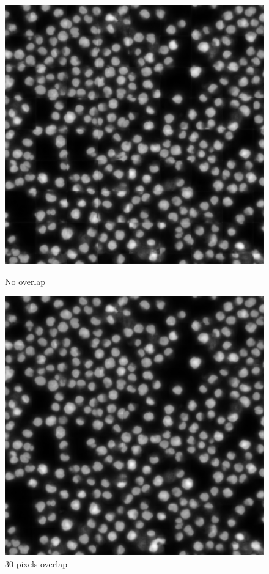 \begin{figure}[htb]
    \centering
    \begin{minipage}{.48\textwidth}
      \centering
      \includegraphics[width=\linewidth]{bilder/crops_combination/prediction_border_0.png}
      \caption{No overlap}
      \label{fig:crops_combination_0}
    \end{minipage}%
    \vspace{1cm}
    \begin{minipage}{.48\textwidth}
      \centering
      \includegraphics[width=\linewidth]{bilder/crops_combination/prediction_border_34.png}
      \caption{30 pixels overlap}
      \label{fig:crops_combination_34}
    \end{minipage}
\end{figure}